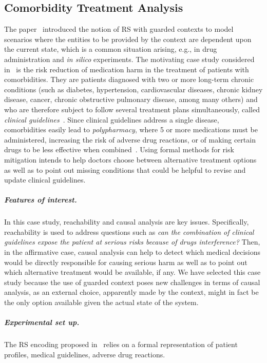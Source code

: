 
\subsection{Comorbidity Treatment Analysis}

The paper~\cite{DBLP:conf/cmsb/BowlesBBFGM24} introduced the notion of RS with guarded contexts to model scenarios where the entities to be provided by the context are dependent upon the current state, which is a common situation arising, e.g., in drug administration and \emph{in silico} experiments. The motivating case study considered in~\cite{DBLP:conf/cmsb/BowlesBBFGM24} is the risk reduction of medication harm in the treatment of patients with comorbidities. They are patients diagnosed with two or more long-term chronic conditions (such as diabetes, hypertension, cardiovascular diseases, chronic kidney disease, cancer, chronic obstructive pulmonary disease, among many others) and who are therefore subject to follow several treatment plans simultaneously, called \emph{clinical guidelines}~\cite{feder1999using,woolf1999potential}. Since clinical guidelines address a single disease, comorbidities easily lead to  \emph{polypharmacy}, where 5 or more medications must be administered, increasing the risk of adverse drug reactions, or of making certain drugs to be less effective when combined~\cite{Gut12}. Using formal methods for risk mitigation intends to help doctors choose between alternative treatment options as well as to point out missing conditions that could be helpful to revise and update clinical guidelines. 

\subparagraph*{Features of interest.}
In this case study, reachability and causal analysis are key issues.
Specifically, reachability is used to address questions such as \emph{can the combination of clinical guidelines expose the patient at serious risks because of drugs interference?}
Then, in the affirmative case, causal analysis can help to detect which medical decisions would be directly responsible for causing serious harm as well as to point out  which alternative treatment would be available, if any.
We have selected this case study because the use of guarded context poses new challenges in terms of causal analysis, as an external choice, apparently made by the context, might in fact be the only option available given the actual state of the system. 

\subparagraph*{Experimental set up.}
The RS encoding proposed in~\cite{DBLP:conf/cmsb/BowlesBBFGM24} relies on a formal representation of patient profiles, medical guidelines, adverse drug reactions.

